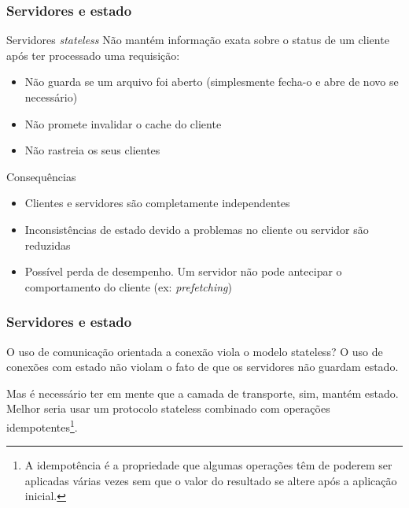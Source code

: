 \documentclass[Ligatures=TeX,table,brazil,svgnames,usetotalslideindicator,compress,10pt]{beamer}
\begin{document}
\begin{frame}
  \frametitle{Servidores e estado}
  \begin{block}{Servidores \textit{stateless}}
    Não mantém informação exata sobre o status de um cliente após ter processado uma requisição:
    \begin{itemize}
    \item Não guarda se um arquivo foi aberto (simplesmente fecha-o e abre de novo se necessário)
    \item Não promete invalidar o cache do cliente
    \item Não rastreia os seus clientes
    \end{itemize}
  \end{block}

  \pause

  \begin{block}{Consequências}
    \begin{itemize}
    \item Clientes e servidores são completamente independentes
    \item \alert{Inconsistências de estado} devido a problemas no cliente ou servidor são reduzidas
    \item Possível \alert{perda de desempenho}. Um servidor não pode antecipar o comportamento do cliente (ex: \textit{prefetching})
    \end{itemize}
  \end{block}

\end{frame}

\begin{frame}
  \frametitle{Servidores e estado}

  \begin{alertblock}{O uso de comunicação orientada a conexão viola o modelo stateless?}
    O uso de conexões com estado não violam o fato de que os
    servidores não guardam estado.

    Mas é necessário ter em mente que a camada de transporte, sim,
    mantém estado. Melhor seria usar um protocolo stateless combinado
    com operações idempotentes\footnote{A idempotência é a propriedade
      que algumas operações têm de poderem ser aplicadas várias vezes
      sem que o valor do resultado se altere após a aplicação
      inicial.}.
  \end{alertblock}

\end{frame}
\end{document}
